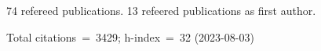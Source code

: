 74 refereed publications. 13 refeered publications as first author.

Total citations~=~3429; h-index~=~32 (2023-08-03)